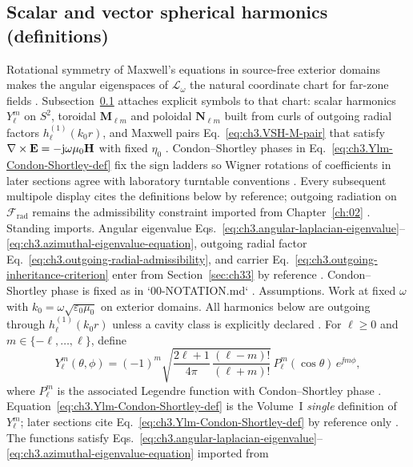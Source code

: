 \subsection{Scalar and vector spherical harmonics (definitions)}
\label{sec:ch341}
Rotational symmetry of Maxwell's equations in source-free exterior domains makes the angular
eigenspaces of $\mathcal{L}_\omega$ the natural coordinate chart for far-zone fields \cite{stratton1941}.
Subsection~\ref{sec:ch341} attaches explicit symbols to that chart: scalar harmonics
$Y_{\ell}^{m}$ on $S^{2}$, toroidal $\mathbf{M}_{\ell m}$ and poloidal $\mathbf{N}_{\ell m}$ built from curls of
outgoing radial factors $h_{\ell}^{(1)}(k_0 r)$, and Maxwell pairs
Eq.~\eqref{eq:ch3.VSH-M-pair} that satisfy $\nabla\times\mathbf{E}=-\mathrm{j}\omega\mu_0\mathbf{H}$ with fixed $\eta_0$
\cite{hansen1988,tai1994}.
Condon--Shortley phases in Eq.~\eqref{eq:ch3.Ylm-Condon-Shortley-def} fix the sign ladders so Wigner
rotations of coefficients in later sections agree with laboratory turntable conventions \cite{jackson1999}.
Every subsequent multipole display cites the definitions below by reference; outgoing radiation on
$\mathcal{F}_{\mathrm{rad}}$ remains the admissibility constraint imported from Chapter~\ref{ch:02}
\cite{stratton1941}.
Standing imports. Angular eigenvalue Eqs.~\eqref{eq:ch3.angular-laplacian-eigenvalue}--\eqref{eq:ch3.azimuthal-eigenvalue-equation},
outgoing radial factor Eq.~\eqref{eq:ch3.outgoing-radial-admissibility}, and carrier
Eq.~\eqref{eq:ch3.outgoing-inheritance-criterion} enter from Section~\ref{sec:ch33} by reference
\cite{stratton1941}. Condon--Shortley phase is fixed as in `00-NOTATION.md`
\cite{hansen1988}.
Assumptions. Work at fixed \(\omega\) with \(k_{0}=\omega\sqrt{\varepsilon_{0}\mu_{0}}\) on exterior domains. All harmonics
below are outgoing through \(h_{\ell}^{(1)}(k_{0}r)\) unless a cavity class is explicitly declared
\cite{stratton1941}.
For \(\ell\ge0\) and \(m\in\{-\ell,\ldots,\ell\}\), define
\begin{equation}
\label{eq:ch3.Ylm-Condon-Shortley-def}
Y_{\ell}^{m}(\theta,\phi)
=
(-1)^{m}
\sqrt{\frac{2\ell+1}{4\pi}\,\frac{(\ell-m)!}{(\ell+m)!}}\,
P_{\ell}^{m}(\cos\theta)\,e^{\jj m\phi},
\end{equation}
where \(P_{\ell}^{m}\) is the associated Legendre function with Condon--Shortley phase
\cite{jackson1999}. Equation~\eqref{eq:ch3.Ylm-Condon-Shortley-def} is the Volume~I
\emph{single} definition of \(Y_{\ell}^{m}\); later sections cite Eq.~\eqref{eq:ch3.Ylm-Condon-Shortley-def} by
reference only \cite{hansen1988}. The functions satisfy
Eqs.~\eqref{eq:ch3.angular-laplacian-eigenvalue}--\eqref{eq:ch3.azimuthal-eigenvalue-equation} imported from
